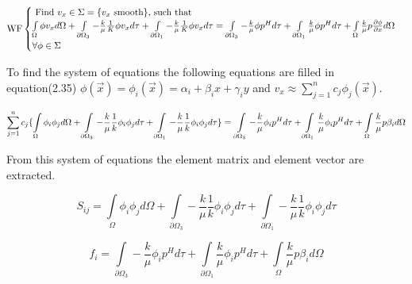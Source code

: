 \documentclass[a4paper]{report}
\begin{document}
\vspace{1mm}

\begin{equation}
\text{WF}
	\begin{cases}
	$ Find $v_x \in \Sigma = \{v_x \text{ smooth}\}$, such that$ \\
		\int\limits_{\Omega}\phi v_x d\Omega + \int\limits_{\partial \Omega_3}-\frac{k}{\mu}\frac{1}{K}\phi v_xd\tau + \int\limits_{\partial \Omega_1}-\frac{k}{\mu}\frac{1}{K}\phi v_x d\tau 
		= \int\limits_{\partial \Omega_3}-\frac{k}{\mu}\phi p^H d\tau +\int\limits_{\partial \Omega_1}\frac{k}{\mu}\phi p^H d\tau + \int\limits_{\Omega}\frac{k}{\mu}p\frac{\partial \phi}{\partial x}d\Omega \\
		\forall \phi \in \Sigma
	\end{cases}
\end{equation}

\vspace{1mm}

To find the system of equations the following equations are filled in equation(2.35)  
$\phi(\vec{x})=\phi_i(\vec{x})= \alpha_i+\beta_i x+\gamma_i y$ and  $v_x\approx \sum\limits_{j=1}^{n}c_j\phi_j(\vec{x})$.

\begin{equation}\label{SoQ2}
	\sum_{j=1}^{n}c_j\{\int\limits_{\Omega}\phi_i\phi_j d\Omega +\int\limits_{\partial\Omega_3}-\frac{k}{\mu}\frac{1}{k}\phi_i\phi_j d\tau + \int\limits_{\partial\Omega_1}-\frac{k}{\mu}\frac{1}{k}\phi_i\phi_j d\tau\} = \\
	\int\limits_{\partial\Omega_3}-\frac{k}{\mu}\phi_i p^H d\tau +\int\limits_{\partial\Omega_1}\frac{k}{\mu}\phi_i p^H d\tau + \int\limits_{\Omega}\frac{k}{\mu}p\beta_id\Omega 
\end{equation}

From this system of equations the element matrix and element vector are extracted.

\begin{equation}
S_{ij}=\int\limits_{\Omega}\phi_i\phi_j d\Omega +\int\limits_{\partial\Omega_3}-\frac{k}{\mu}\frac{1}{k}\phi_i\phi_j d\tau + \int\limits_{\partial\Omega_1}-\frac{k}{\mu}\frac{1}{k}\phi_i\phi_j d\tau 
\end{equation}

\begin{equation}
f_i = 
\int\limits_{\partial\Omega_3}-\frac{k}{\mu}\phi_i p^H d\tau +\int\limits_{\partial\Omega_1}\frac{k}{\mu}\phi_i p^H d\tau + \int\limits_{\Omega}\frac{k}{\mu}p\beta_id\Omega
\end{equation}
\end{document}

